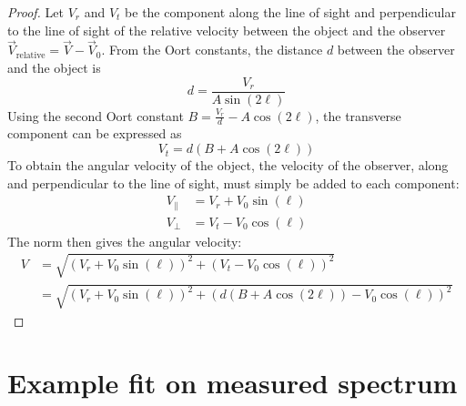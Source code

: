 \begin{proof}
    Let $V_r$ and $V_t$ be the component along the line of sight and perpendicular to the line of sight of the relative velocity between the object and the observer $\vec V_\textrm{relative} = \vec V - \vec V_0$. From the Oort constants, the distance $d$ between the observer and the object is
    \begin{equation}
        d = \frac{V_r}{A \sin(2\ell)}
    \end{equation}
    Using the second Oort constant $B = \frac{V_r}{d} - A \cos(2\ell)$, the transverse component can be expressed as
    \begin{equation}
        V_t = d (B + A \cos(2\ell))
    \end{equation}
    To obtain the angular velocity of the object, the velocity of the observer, along and perpendicular to the line of sight, must simply be added to each component:
    \begin{align}
        V_{\parallel} &= V_r + V_0 \sin(\ell) \\
        V_{\perp} &= V_t - V_0 \cos(\ell)
    \end{align}
    The norm then gives the angular velocity:
    \begin{equation}
        \begin{aligned}
            V &= \sqrt{(V_r + V_0 \sin(\ell))^2 + (V_t - V_0 \cos(\ell))^2} \\
            &= \sqrt{(V_r + V_0 \sin(\ell))^2 + (d (B + A \cos(2\ell)) - V_0 \cos(\ell))^2}
        \end{aligned}
    \end{equation}
\end{proof}

\section{Example fit on measured spectrum}
\label{sec:fittings}

